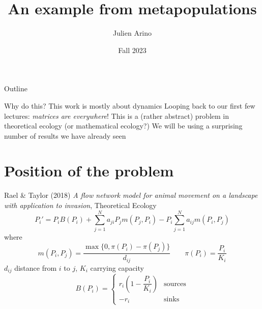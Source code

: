 \documentclass[aspectratio=169]{beamer}
\title{An example from metapopulations}
\author{Julien Arino}
\date{Fall 2023}
\begin{document}
\begin{frame}
	\titlepage
\end{frame}
\addtocounter{page}{-1}
  
  
\begin{frame}{Outline}
	  \tableofcontents[hideallsubsections]
\end{frame}
\addtocounter{page}{-1}


\begin{frame}{Why do this?}
	This work is mostly about dynamics
	\vfill
	Looping back to our first few lectures: \emph{matrices are everywhere}!
	\vfill
	This is a (rather abstract) problem in theoretical ecology (or mathematical ecology?)
	\vfill
	We will be using a surprising number of results we have already seen
\end{frame}

\section{Position of the problem}
\begin{frame}{Rael \& Taylor (2018)}
	{\footnotesize\emph{A flow network model for animal movement on a landscape with application to invasion}, Theoretical Ecology}
	\vfill
	\[
	P_i' = P_iB(P_i)+\sum_{j=1}^N 
	a_{ji}P_jm(P_j,P_i)
	-P_i\sum_{j=1}^N a_{ij}m(P_i,P_j)
	\]
	where
	\[
	m(P_i, P_j) = \frac{\max\{0, \pi(P_i)-\pi(P_j)\}}{d_{ij}}
	\qquad \pi(P_i) = \frac{P_i}{K_i}
	\]
	$d_{ij}$ distance from $i$ to $j$, $K_i$ carrying capacity
	\[
	B(P_i) = \begin{cases}
	r_i\left(1-\dfrac{P_i}{K_i}\right) & \textrm{sources} \\
	-r_i & \textrm{sinks}
	\end{cases}
	\]
\end{frame}
	
\end{document}

